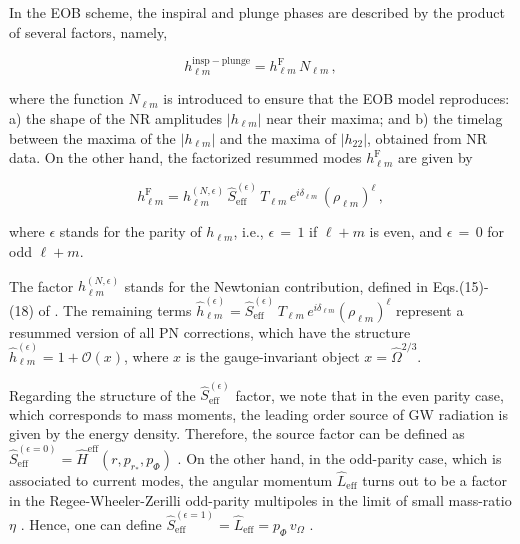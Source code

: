 In the EOB scheme, the inspiral and plunge phases are described by the product of several factors, namely, 

\begin{equation}\label{hip}
  h^\mathrm{insp-plunge}_{\ell m} = h^\mathrm{F}_{\ell m}\,N_{\ell m}\,,
\end{equation}

 \noindent where the function \(N_{\ell m}\) is introduced to ensure that the EOB model reproduces: a) the shape of the NR amplitudes \(|h_{\ell m}|\) near their maxima; and b) the timelag between the maxima of the \(|h_{\ell m}|\) and the maxima of \(|h_{22}|\), obtained from NR data. On the other hand, the factorized resummed modes \(h^\mathrm{F}_{\ell m}\) are given by
 
 \begin{equation}\label{hlm}
  h^\mathrm{F}_{\ell m}=h_{\ell m}^{(N,\epsilon)}\,\hat{S}_\mathrm{eff}^{(\epsilon)}\, T_{\ell m}\, e^{i\delta_{\ell m}}\,\left(\rho_{\ell m}\right)^\ell\,,
\end{equation}

\noindent where \(\epsilon\) stands for the parity of \(h_{\ell m}\), i.e., \(\epsilon\,=\,1\) if \( \ell+m\) is even, and \(\epsilon\,=\,0\) for odd \( \ell+m\). 


The factor  \(h_{\ell m}^{(N,\epsilon)}\) stands for the Newtonian contribution, defined in Eqs.(15)-(18) of \cite{BuonannoEOBv2Main}. The remaining terms \(\hat{h}_{\ell m}^{(\epsilon)}= \hat{S}_\mathrm{eff}^{(\epsilon)}\, T_{\ell m}\, e^{i\delta_{\ell m}}\left(\rho_{\ell m}\right)^\ell\) represent a resummed version of all PN corrections, which have the structure \(\hat{h}_{\ell m}^{(\epsilon)}= 1+ {\mathcal{O}}(x)\), where \(x\) is the gauge-invariant object \(x=\hat{\Omega}^{2/3}\). 


Regarding the structure of the \(\hat{S}_\mathrm{eff}^{(\epsilon)}\) factor, we note that in the even parity case, which corresponds to mass moments, the leading order source of GW radiation is given by the energy density. Therefore, the source factor can be defined as  \(\hat{S}_\mathrm{eff}^{(\epsilon=0)} =  \hat{H}^\mathrm{eff}(r, p_{r_*}, p_\Phi)\)  \cite{resu}. On the other hand,  in the odd-parity case, which is associated to current modes, the angular momentum \(\hat{L}_\mathrm{eff}\) turns out to be a factor in the Regee-Wheeler-Zerilli odd-parity multipoles in the limit of small mass-ratio \(\eta\) \cite{resu}. Hence, one can define \(\hat{S}_\mathrm{eff}^{(\epsilon=1)} =  \hat{L}_\mathrm{eff}= p_\Phi\, v_\Omega\)  \cite{BuonannoEOBv2Main}.

